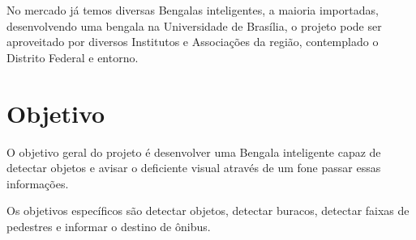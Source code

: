 No mercado já temos diversas Bengalas inteligentes, a maioria importadas, desenvolvendo uma bengala na Universidade de Brasília, o projeto pode ser aproveitado por diversos Institutos e Associações da região, contemplado o Distrito Federal e entorno.
	

\section{Objetivo}

O objetivo geral do projeto é desenvolver uma Bengala inteligente capaz de detectar objetos e avisar o deficiente visual através de um fone passar essas informações. 

Os objetivos específicos são detectar objetos, detectar buracos, detectar faixas de pedestres e  informar o destino de ônibus.
